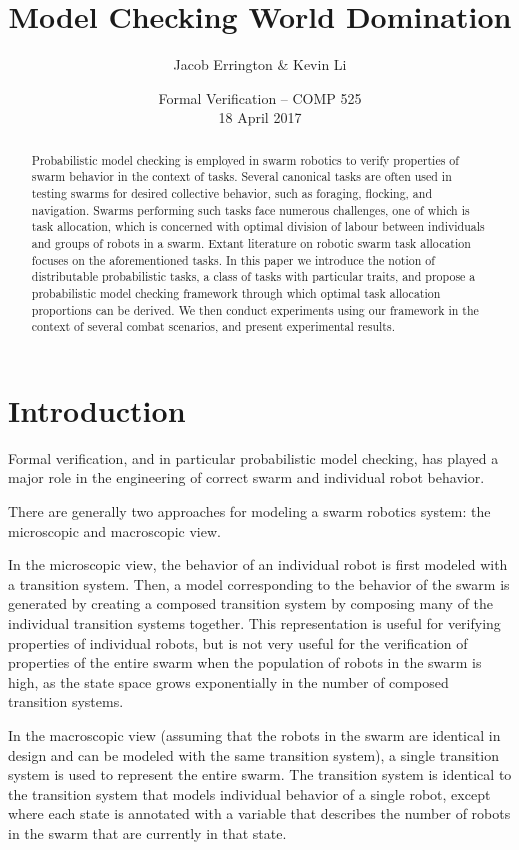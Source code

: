 \documentclass[11pt]{article}
\title{Model Checking World Domination}
\author{Jacob Errington \& Kevin Li}
\date{Formal Verification -- COMP 525\\18 April 2017}
\theoremstyle{definition}
\begin{document}
\maketitle

\begin{abstract}
    Probabilistic model checking is employed
    in swarm robotics to verify
    properties of swarm behavior in the context of
    tasks. Several canonical tasks are often used
    in testing swarms for desired collective behavior,
    such as foraging, flocking, and navigation.
    Swarms performing such tasks face numerous challenges,
    one of which is task allocation, which is concerned 
    with optimal division of labour between individuals 
    and groups of robots in a swarm.  Extant literature 
    on robotic swarm task allocation focuses on the 
    aforementioned tasks. In this paper we introduce the
    notion of distributable probabilistic tasks,
    a class of tasks with particular traits, and
    propose a probabilistic model checking framework
    through which optimal task allocation proportions
    can be derived. We then conduct experiments using our
    framework in the context of several combat scenarios,
    and present experimental results.
\end{abstract}

\section{Introduction}\label{sec:intro}

Formal verification, and in particular probabilistic model
checking, has played a major role in the engineering of
correct swarm and individual robot behavior. %

There are generally two approaches for modeling a swarm robotics
system: the microscopic and macroscopic view.

In the microscopic view, the behavior of an individual robot
is first modeled with a transition system. Then,
a model corresponding to the behavior of the swarm is
generated by creating a composed transition system
by composing many of the individual transition systems
together. This representation is useful for verifying
properties of individual robots, but is not
very useful for the verification of properties of the
entire swarm when the population of robots in the swarm
is high, as the state space grows exponentially in
the number of composed transition systems.

In the macroscopic view (assuming that the robots
in the swarm are identical in design and can be
modeled with the same transition system), a single
transition system is used to represent the entire
swarm. The transition system is identical to the
transition system that models individual behavior of
a single robot, except where each state is
annotated with a variable that describes the
number of robots in the swarm that are currently
in that state. \cite{konur12}
\end{document}
